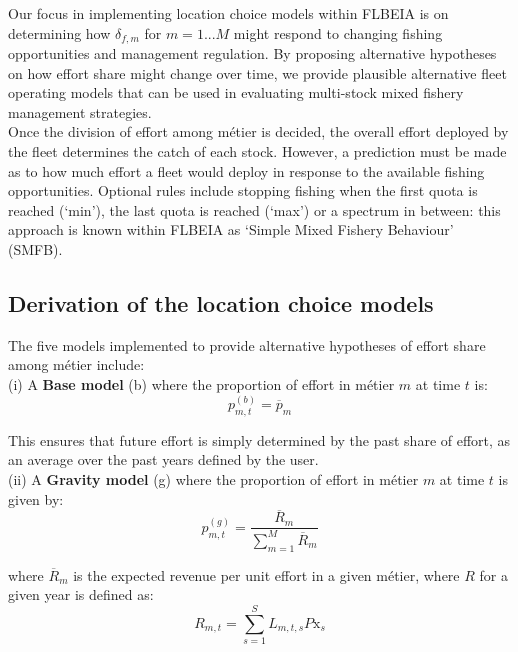 \documentclass[12pt, halfline, a4paper]{ouparticle}
\begin{document}
Our focus in implementing location choice models within FLBEIA is on
determining how $\delta_{f,m}$ for $m=1...M$ might respond to changing fishing
opportunities and management regulation. By proposing alternative hypotheses on
how effort share might change over time, we provide plausible alternative fleet
operating models that can be used in evaluating multi-stock mixed fishery
management strategies.  \\

Once the division of effort among métier is decided, the overall effort
deployed by the fleet determines the catch of each stock. However, a prediction
must be made as to how much effort a fleet would deploy in response to the
available fishing opportunities. Optional rules include stopping fishing when
the first quota is reached (`min'), the last quota is reached (`max') or a
spectrum in between: this approach is known within FLBEIA as `Simple Mixed
Fishery Behaviour' (SMFB).

\subsection{Derivation of the location choice models}

The five models implemented to provide alternative hypotheses of effort share
among métier include:\\

(i) A \textbf{Base model} (b) where the proportion of effort in métier $m$ at time
$t$ is:
\begin{equation}
p^{(b)}_{m,t} = \overline{p}_{m}
\end{equation}

This ensures that future effort is simply determined by the past share of
effort, as an average over the past years defined by the user. \\

(ii) A \textbf{Gravity model} (g) where the proportion of effort in métier $m$ at
time $t$ is given by: 
\begin{equation}
p^{(g)}_{m,t} = \frac{\overline{R}_{m}}{\sum\limits_{m=1}^{M}\overline{R}_{m}} 
\end{equation}

where $\overline{R}_m$ is the expected revenue per unit effort in a given
métier, where $R$ for a given year is defined as: 
\begin{equation}
R_{m,t} =  \sum\limits_{s=1}^{S} L_{m,t,s} P\text{x}_{s} 
\label{eqn:ppue}
\end{equation}
\end{document}
